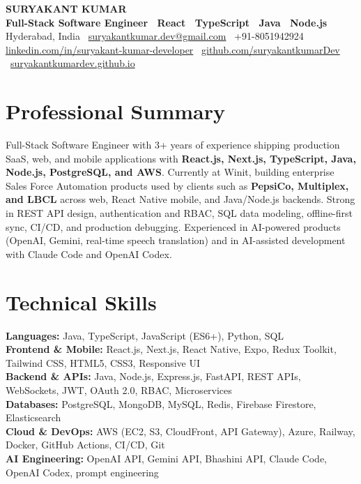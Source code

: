 \documentclass[a4paper,11pt]{article}
\begin{document}
\begin{center}
{\fontsize{21}{23}\selectfont\bfseries\color{accent} SURYAKANT KUMAR}\\[2pt]
{\normalsize\bfseries Full-Stack Software Engineer \textbar\ React \textbar\ TypeScript \textbar\ Java \textbar\ Node.js}\\[3pt]
{\small Hyderabad, India \textbar\ \href{mailto:suryakantkumar.dev@gmail.com}{suryakantkumar.dev@gmail.com} \textbar\ +91-8051942924}\\[1pt]
{\small \href{https://www.linkedin.com/in/suryakant-kumar-developer}{linkedin.com/in/suryakant-kumar-developer} \textbar\
\href{https://github.com/suryakantkumarDev}{github.com/suryakantkumarDev} \textbar\
\href{https://suryakantkumardev.github.io/}{suryakantkumardev.github.io}}
\end{center}

\section*{Professional Summary}
Full-Stack Software Engineer with 3+ years of experience shipping production SaaS, web, and mobile applications with \textbf{React.js, Next.js, TypeScript, Java, Node.js, PostgreSQL, and AWS}. Currently at Winit, building enterprise Sales Force Automation products used by clients such as \textbf{PepsiCo, Multiplex, and LBCL} across web, React Native mobile, and Java/Node.js backends. Strong in REST API design, authentication and RBAC, SQL data modeling, offline-first sync, CI/CD, and production debugging. Experienced in AI-powered products (OpenAI, Gemini, real-time speech translation) and in AI-assisted development with Claude Code and OpenAI Codex.

\section*{Technical Skills}
\textbf{Languages:} Java, TypeScript, JavaScript (ES6+), Python, SQL \\[2pt]
\textbf{Frontend \& Mobile:} React.js, Next.js, React Native, Expo, Redux Toolkit, Tailwind CSS, HTML5, CSS3, Responsive UI \\[2pt]
\textbf{Backend \& APIs:} Java, Node.js, Express.js, FastAPI, REST APIs, WebSockets, JWT, OAuth 2.0, RBAC, Microservices \\[2pt]
\textbf{Databases:} PostgreSQL, MongoDB, MySQL, Redis, Firebase Firestore, Elasticsearch \\[2pt]
\textbf{Cloud \& DevOps:} AWS (EC2, S3, CloudFront, API Gateway), Azure, Railway, Docker, GitHub Actions, CI/CD, Git \\[2pt]
\textbf{AI Engineering:} OpenAI API, Gemini API, Bhashini API, Claude Code, OpenAI Codex, prompt engineering
\end{document}
